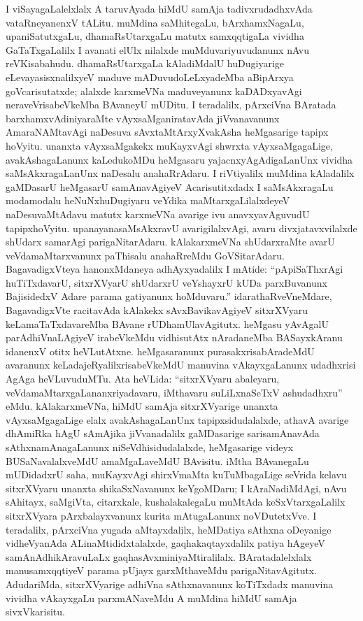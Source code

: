 I viSayagaLalelxlalx A taruvAyada hiMdU samAja tadivxrudadhxvAda vataRne\-yanenxV tALitu. muMdina saMhitegaLu, bArxhamxNagaLu, upaniSatutxgaLu, dhamaRsUtarxgaLu matutx samxqqtigaLa vividha GaTaTxgaLalilx I avanati elUlx nilalxde muMduvariyuvudanunx nAvu reVKisabahudu. dhamaRsUtarxgaLa kAladiMdalU huDugiyarige eLe\-vayasisxnalilxyeV maduve mADuvudoLeLxyadeMba aBipArxya goVcarisutatxde; alalxde karxmeVNa maduve\-yanunx kaDADxyavAgi neraveVrisabeVkeMba BAvaneyU mUDitu. I teradalilx, pArxciVna BAratada barxhamxvAdiniyaraMte vAyxsaMganiratavAda jiVvanavanunx AmaraNAMtavAgi naDesuva sAvxtaMtArxyXvakAsha heMgasarige tapipx hoVyitu. unanxta vAyxsaMgakekx muKayx\-vAgi shwrxta vAyxsaMgagaLige, avakAshagaLanunx kaLedukoMDu heMgasaru yajacnxyAgAdi\-gaLanUnx vividha saMsAkxragaLanUnx naDesalu anahaRrAdaru. I riVtiyalilx \hbox{muMdina} kAladalilx gaMDasarU heMgasarU samAnavAgiyeV Acarisutitxdadx I saMsAkxragaLu modamodalu heNuNxhuDugiyaru veYdika maMtarxgaLilalxdeyeV naDesu\-vaMtAdavu matutx karxmeVNa avarige ivu anavxyavAguvudU tapipxhoVyitu. upanayanasaMsAkxravU avarigilalxvAgi, avaru divxjatavxvilalxde shUdarx samarAgi parigaNitarAdaru. kAlakarxmeVNa shUdarxraMte avarU veVdamaMtarxvanunx paThisalu anahaRreMdu GoVSitarAdaru. BagavadigxVteya hanonxMda\-neya adhAyxyadalilx I mAtide: ``pApiSaThxrAgi huTiTxdavarU, sitxrXVyarU shUdarxrU veYshayxrU kUDa parxBuvanunx BajisidedxV Adare parama gatiyanunx hoMduvaru.'' idarathaR\-veVneMdare, BagavadigxVte racitavAda kAlakekx sAvxBavikavAgiyeV sitxrXVyaru keLamaTaTxdava\-reMba BAvane rUDhamUlavAgitutx. heMgasu yAvAgalU parAdhiVnaLAgiyeV ira\-beVkeMdu vidhisutAtx nAradaneMba BASayxkAranu idanenxV otitx heVLutAtxne. heMgasaranunx purasakxrisabAradeMdU avaranunx keLadajeR\-yalilxrisabeVkeMdU manuvina vAkayxgaLanunx udadhxrisi AgAga heVLuvuduMTu. Ata heVLida: ``sitxrXVyaru abaleyaru, veVdamaMtarx\-gaLananxriyadavaru, iMthavaru suLiLxnaSeTxV ashudadhxru'' eMdu. kAlakarxmeVNa, hiMdU samAja sitxrXVyarige unanxta vAyxsaMgagaLige elalx avakAshagaLanUnx tapipxsidudalalxde, athavA avarige dhAmiRka hAgU sAmAjika jiVvanadalilx gaMDasarige sarisamAnavAda sAthxna\-mAnagaLanunx niSeVdhisidudalalxde, heMgasarige videyx BUSaNavalalxveMdU amaMgaLa\-veMdU BAvisitu. iMtha BAvanegaLu mUDidadxrU saha, muKayxvAgi shirxVmaMta kuTuMbagaLige seVrida kelavu sitxrXVyaru unanxta shikaSxNa\-vanunx keYgoMDaru; I kAraNa\-diMdAgi, nAvu sAhitayx, saMgiVta, citarxkale, kushalakalegaLu muMtAda keSxVtarxgaLalilx sitxrXVyara pArxbalayxvanunx kurita mAtugaLanunx noVDutetxVve. I teradalilx, pArxciVna yugada aMtayx\-dalilx, heMDatiya sAthxna oDeyanige vidheVyanAda ALinaMtididxtalalxde, gaqhakaqtayxdalilx patiya hAgeyeV samAnAdhikAravuLaLx gaqhasAvxmini\-yaMtiralilalx. BAratadalelxlalx manu\-samxqqtiyeV parama pUjayx garxMthaveMdu parigaNita\-vAgitutx. AdudariMda, sitxrXVyarige adhiVna sAthxnavanunx koTiTxdadx manuvina vividha vAkayxgaLu parxmANaveMdu A muMdina hiMdU samAja sivxVkarisitu.

